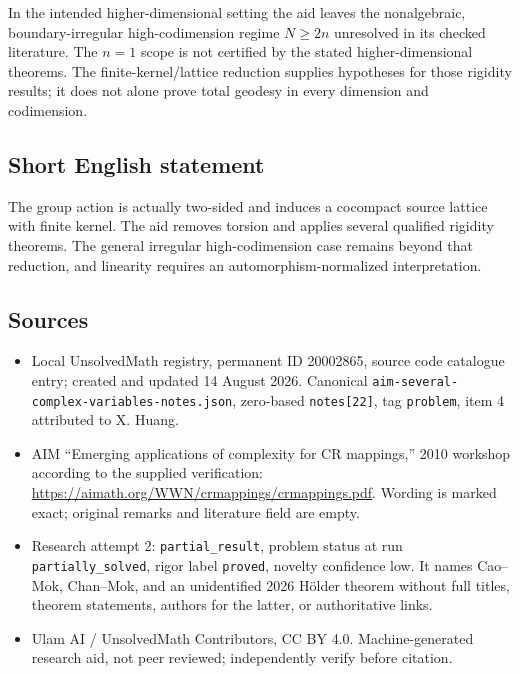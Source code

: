 \documentclass[11pt]{article}
\begin{document}
In the intended higher-dimensional setting the aid leaves the nonalgebraic, boundary-irregular high-codimension regime $N\ge2n$ unresolved in its checked literature. The $n=1$ scope is not certified by the stated higher-dimensional theorems. The finite-kernel/lattice reduction supplies hypotheses for those rigidity results; it does not alone prove total geodesy in every dimension and codimension.
\subsection{Short English statement}
The group action is actually two-sided and induces a cocompact source lattice with finite kernel. The aid removes torsion and applies several qualified rigidity theorems. The general irregular high-codimension case remains beyond that reduction, and linearity requires an automorphism-normalized interpretation.
\subsection{Sources}
\begin{itemize}
\item Local UnsolvedMath registry, permanent ID 20002865, source code catalogue entry; created and updated 14 August 2026. Canonical \texttt{aim-several-complex-variables-notes.json}, zero-based \texttt{notes[22]}, tag \texttt{problem}, item 4 attributed to X. Huang.
\item AIM ``Emerging applications of complexity for CR mappings,'' 2010 workshop according to the supplied verification: \url{https://aimath.org/WWN/crmappings/crmappings.pdf}. Wording is marked exact; original remarks and literature field are empty.
\item Research attempt 2: \texttt{partial\_result}, problem status at run \texttt{partially\_solved}, rigor label \texttt{proved}, novelty confidence low. It names Cao--Mok, Chan--Mok, and an unidentified 2026 H\"older theorem without full titles, theorem statements, authors for the latter, or authoritative links.
\item Ulam AI / UnsolvedMath Contributors, CC BY 4.0. Machine-generated research aid, not peer reviewed; independently verify before citation.
\end{itemize}
\end{document}
